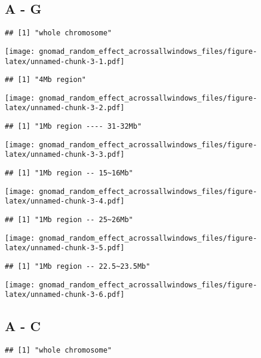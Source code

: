 \documentclass[
]{article}
\begin{document}
\hypertarget{a---g}{%
\subsection{A - G}\label{a---g}}

\begin{verbatim}
## [1] "whole chromosome"
\end{verbatim}

\texttt{[image: gnomad\_random\_effect\_acrossallwindows\_files/figure-latex/unnamed-chunk-3-1.pdf]}

\begin{verbatim}
## [1] "4Mb region"
\end{verbatim}

\texttt{[image: gnomad\_random\_effect\_acrossallwindows\_files/figure-latex/unnamed-chunk-3-2.pdf]}

\begin{verbatim}
## [1] "1Mb region ---- 31-32Mb"
\end{verbatim}

\texttt{[image: gnomad\_random\_effect\_acrossallwindows\_files/figure-latex/unnamed-chunk-3-3.pdf]}

\begin{verbatim}
## [1] "1Mb region -- 15~16Mb"
\end{verbatim}

\texttt{[image: gnomad\_random\_effect\_acrossallwindows\_files/figure-latex/unnamed-chunk-3-4.pdf]}

\begin{verbatim}
## [1] "1Mb region -- 25~26Mb"
\end{verbatim}

\texttt{[image: gnomad\_random\_effect\_acrossallwindows\_files/figure-latex/unnamed-chunk-3-5.pdf]}

\begin{verbatim}
## [1] "1Mb region -- 22.5~23.5Mb"
\end{verbatim}

\texttt{[image: gnomad\_random\_effect\_acrossallwindows\_files/figure-latex/unnamed-chunk-3-6.pdf]}

\hypertarget{a---c}{%
\subsection{A - C}\label{a---c}}

\begin{verbatim}
## [1] "whole chromosome"
\end{verbatim}
\end{document}
